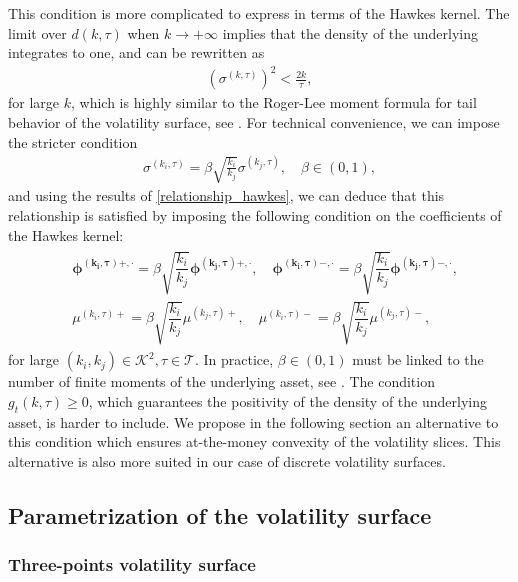 \documentclass[12pt]{article}
\begin{document}
This condition is more complicated to express in terms of the Hawkes kernel. The limit over $d(k,\tau)$ when $k\to +\infty$ implies that the density of the underlying integrates to one, and can be rewritten as
\begin{align*}
    (\sigma^{(k,\tau)})^2 < \frac{2k}{\tau},
\end{align*}
for large $k$, which is highly similar to the Roger-Lee moment formula for tail behavior of the volatility surface, see \cite{lee2004moment}. For technical convenience, we can impose the stricter condition
\begin{align*}
    \sigma^{(k_i,\tau)} = \beta \sqrt{\frac{k_i}{ k_j}}\sigma^{(k_j,\tau)},\quad \beta\in (0,1),
\end{align*}
and using the results of \eqref{relationship_hawkes}, we can deduce that this relationship is satisfied by imposing the following condition on the coefficients of the Hawkes kernel:
\begin{align}\label{cond_no_arbitrage_butterfly_kernel}
\begin{split}
     & \boldsymbol{\phi^{(k_i,\tau)+, \cdot}} =\beta \sqrt{\dfrac{k_i}{k_j}} \boldsymbol{\phi^{(k_j,\tau)+, \cdot}}, \quad 
    \boldsymbol{\phi^{(k_i,\tau)-, \cdot}} = \beta\sqrt{\dfrac{k_i}{k_j}} \boldsymbol{\phi^{(k_j,\tau)-, \cdot}}, \\
    & \mu^{(k_i,\tau)+} = \beta\sqrt{\dfrac{k_i}{k_j}}\mu^{(k_j,\tau)+},\quad  \mu^{(k_i,\tau)-} = \beta\sqrt{\dfrac{k_i}{k_j}}\mu^{(k_j,\tau)-},
\end{split}
\end{align}
for large $(k_i,k_j)\in \mathcal{K}^2,\tau\in\mathcal{T}$. In practice, $\beta\in(0,1)$ must be linked to the number of finite moments of the underlying asset, see \cite{lee2004moment}. The condition $g_t(k,\tau)\geq 0$, which guarantees the positivity of the density of the underlying asset, is harder to include. We propose in the following section an alternative to this condition which ensures at-the-money convexity of the volatility slices. This alternative is also more suited in our case of discrete volatility surfaces. 


\subsection{Parametrization of the volatility surface}

\subsubsection{Three-points volatility surface}
\end{document}
